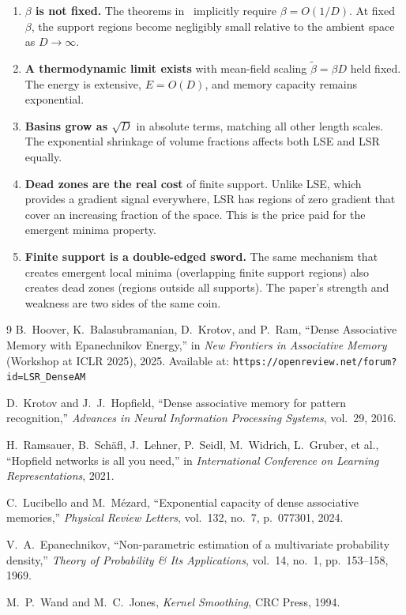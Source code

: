 \documentclass[11pt]{article}
\begin{document}
\begin{enumerate}
  \item \textbf{$\beta$ is not fixed.}
    The theorems in~\cite{Hoover2025} implicitly require $\beta = O(1/D)$.
    At fixed $\beta$, the support regions become negligibly small relative
    to the ambient space as $D\to\infty$.

  \item \textbf{A thermodynamic limit exists} with mean-field scaling
    $\tilde\beta = \beta D$ held fixed.  The energy is extensive, $E = O(D)$,
    and memory capacity remains exponential.

  \item \textbf{Basins grow as $\sqrt{D}$} in absolute terms, matching all
    other length scales.  The exponential shrinkage of volume fractions
    affects both LSE and LSR equally.

  \item \textbf{Dead zones are the real cost} of finite support.
    Unlike LSE, which provides a gradient signal everywhere, LSR has regions
    of zero gradient that cover an increasing fraction of the space.
    This is the price paid for the emergent minima property.

  \item \textbf{Finite support is a double-edged sword.}
    The same mechanism that creates emergent local minima (overlapping
    finite support regions) also creates dead zones (regions outside all
    supports).  The paper's strength and weakness are two sides of the same
    coin.
\end{enumerate}

\begin{thebibliography}{9}
  B.~Hoover, K.~Balasubramanian, D.~Krotov, and P.~Ram,
  ``Dense Associative Memory with Epanechnikov Energy,''
  in \emph{New Frontiers in Associative Memory} (Workshop at ICLR 2025),
  2025.
  Available at: \texttt{https://openreview.net/forum?id=LSR\_DenseAM}

  D.~Krotov and J.~J.~Hopfield,
  ``Dense associative memory for pattern recognition,''
  \emph{Advances in Neural Information Processing Systems}, vol.~29, 2016.

  H.~Ramsauer, B.~Sch\"afl, J.~Lehner, P.~Seidl, M.~Widrich, L.~Gruber,
  et al.,
  ``Hopfield networks is all you need,''
  in \emph{International Conference on Learning Representations}, 2021.

  C.~Lucibello and M.~M\'ezard,
  ``Exponential capacity of dense associative memories,''
  \emph{Physical Review Letters}, vol.~132, no.~7, p.~077301, 2024.

  V.~A.~Epanechnikov,
  ``Non-parametric estimation of a multivariate probability density,''
  \emph{Theory of Probability \& Its Applications}, vol.~14, no.~1,
  pp.~153--158, 1969.

  M.~P.~Wand and M.~C.~Jones,
  \emph{Kernel Smoothing}, CRC Press, 1994.
\end{thebibliography}
\end{document}
